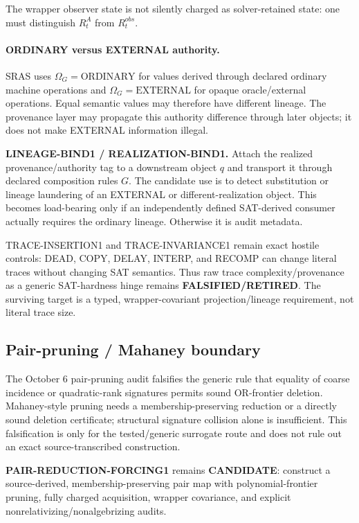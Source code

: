 \documentclass[11pt]{article}
\newcommand{\statusretired}{\textcolor{retired}{\textbf{FALSIFIED/RETIRED}}}
\newcommand{\statuscandidate}{\textcolor{candidate}{\textbf{CANDIDATE}}}
\theoremstyle{plain}
\theoremstyle{definition}
\theoremstyle{remark}
\begin{document}
The wrapper observer state is not silently charged as solver-retained state:
one must distinguish \(R_t^A\) from \(R_t^{obs}\).

\paragraph{ORDINARY versus EXTERNAL authority.}
SRAS uses \(\Omega_G=\mathrm{ORDINARY}\) for values derived through declared
ordinary machine operations and \(\Omega_G=\mathrm{EXTERNAL}\) for opaque
oracle/external operations. Equal semantic values may therefore have different
lineage. The provenance layer may propagate this authority difference through
later objects; it does not make EXTERNAL information illegal.

\begin{candidatebox}
\textbf{LINEAGE-BIND1 / REALIZATION-BIND1.}
Attach the realized provenance/authority tag to a downstream object \(q\) and
transport it through declared composition rules \(G\). The candidate use is
to detect substitution or lineage laundering of an EXTERNAL or
different-realization object. This becomes load-bearing only if an
independently defined SAT-derived consumer actually requires the ordinary
lineage. Otherwise it is audit metadata.
\end{candidatebox}

TRACE-INSERTION1 and TRACE-INVARIANCE1 remain exact hostile controls: DEAD,
COPY, DELAY, INTERP, and RECOMP can change literal traces without changing SAT
semantics. Thus raw trace complexity/provenance as a generic SAT-hardness hinge
remains \statusretired. The surviving target is a typed, wrapper-covariant
projection/lineage requirement, not literal trace size.

\subsection{Pair-pruning / Mahaney boundary}

The October 6 pair-pruning audit falsifies the generic rule that equality of
coarse incidence or quadratic-rank signatures permits sound OR-frontier
deletion. Mahaney-style pruning needs a membership-preserving reduction or a
directly sound deletion certificate; structural signature collision alone is
insufficient. This falsification is only for the tested/generic surrogate
route and does not rule out an exact source-transcribed construction.

\textbf{PAIR-REDUCTION-FORCING1} remains \statuscandidate: construct a
source-derived, membership-preserving pair map with polynomial-frontier
pruning, fully charged acquisition, wrapper covariance, and explicit
nonrelativizing/nonalgebrizing audits.
\end{document}
